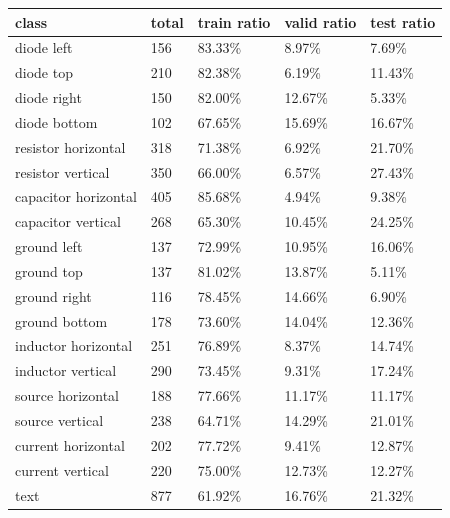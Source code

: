 \documentclass[aspectratio=43,t]{beamer}
\begin{document}
\begin{frame}

\begin{table}
\begin{center}
\scriptsize
\begin{tabular}{l|l|l|l|l|}

\textbf{class} & \textbf{total} & \textbf{train ratio} & \textbf{valid ratio} & \textbf{test ratio} \\
    \hline
    diode left              & 156    &  83.33\%  &    8.97\%  &  7.69\% \\
    diode top               & 210    &  82.38\%  &    6.19\%  & 11.43\% \\
    diode right             & 150    &  82.00\%  &   12.67\%  &  5.33\% \\
    diode bottom            & 102    &  67.65\%  &   15.69\%  & 16.67\% \\
    resistor horizontal     & 318    &  71.38\%  &    6.92\%  & 21.70\% \\
    resistor vertical       & 350    &  66.00\%  &    6.57\%  & 27.43\% \\
    capacitor horizontal    & 405    &  85.68\%  &    4.94\%  &  9.38\% \\
    capacitor vertical      & 268    &  65.30\%  &   10.45\%  & 24.25\% \\
    ground left             & 137    &  72.99\%  &   10.95\%  & 16.06\% \\
    ground top              & 137    &  81.02\%  &   13.87\%  &  5.11\% \\
    ground right            & 116    &  78.45\%  &   14.66\%  &  6.90\% \\
    ground bottom           & 178    &  73.60\%  &   14.04\%  & 12.36\% \\
    inductor horizontal     & 251    &  76.89\%  &    8.37\%  & 14.74\% \\
    inductor vertical       & 290    &  73.45\%  &    9.31\%  & 17.24\% \\
    source horizontal       & 188    &  77.66\%  &   11.17\%  & 11.17\% \\
    source vertical         & 238    &  64.71\%  &   14.29\%  & 21.01\% \\
    current horizontal      & 202    &  77.72\%  &    9.41\%  & 12.87\% \\
    current vertical        & 220    &  75.00\%  &   12.73\%  & 12.27\% \\
    text                    & 877    &  61.92\%  &   16.76\%  & 21.32\% \\

\end{tabular}
\end{center}
\end{table}
\end{frame}
\end{document}
